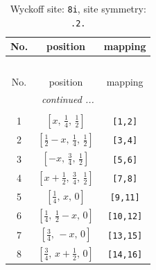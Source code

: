 \documentclass[fleqn,8pt]{jsarticle}
\begin{document}
\begin{longtable}{ccc}
\caption{Wyckoff site: {\tt 8i}, site symmetry: {\tt .2.}}
 \\
 \hline \hline
No. & position & mapping \\ \hline \endfirsthead

\multicolumn{2}{l}{\tablename\ \thetable{}} \\
 \hline \hline
No. & position & mapping \\ \hline \endhead

 \hline \hline
\multicolumn{2}{r}{\footnotesize\it continued ...} \\ \endfoot

 \hline \hline
\multicolumn{2}{r}{} \\ \endlastfoot

1 & $\left[ x,\, \frac{1}{4},\, \frac{1}{2} \right]$ & {\tt [1,2]} \\ \hline
2 & $\left[ \frac{1}{2} - x,\, \frac{1}{4},\, \frac{1}{2} \right]$ & {\tt [3,4]} \\ \hline
3 & $\left[ - x,\, \frac{3}{4},\, \frac{1}{2} \right]$ & {\tt [5,6]} \\ \hline
4 & $\left[ x + \frac{1}{2},\, \frac{3}{4},\, \frac{1}{2} \right]$ & {\tt [7,8]} \\ \hline
5 & $\left[ \frac{1}{4},\, x,\, 0 \right]$ & {\tt [9,11]} \\ \hline
6 & $\left[ \frac{1}{4},\, \frac{1}{2} - x,\, 0 \right]$ & {\tt [10,12]} \\ \hline
7 & $\left[ \frac{3}{4},\, - x,\, 0 \right]$ & {\tt [13,15]} \\ \hline
8 & $\left[ \frac{3}{4},\, x + \frac{1}{2},\, 0 \right]$ & {\tt [14,16]} \\
\end{longtable}
\renewcommand{\arraystretch}{1.2}
\end{document}
